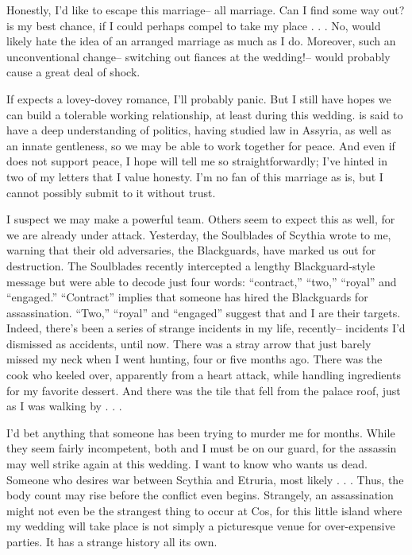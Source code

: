\documentclass[char]{Kos}
\begin{document}
Honestly, I'd like to escape this marriage-- all marriage. Can I find some way out? \cPoet{} is my best chance, if I could perhaps compel \cPoet{} to take my place . . . No, \cPoet{\they} would likely hate the idea of an arranged marriage as much as I do. Moreover, such an unconventional change-- switching out fiances at the wedding!-- would probably cause a great deal of shock.

 If \cBride{\they} expects a lovey-dovey romance, I'll probably panic. But I still have hopes we can build a tolerable working relationship, at least during this wedding. \cBride{\They} is said to have a deep understanding of politics, having studied law in Assyria, as well as an innate gentleness, so we may be able to work together for peace. And even if \cBride{\they} does not support peace, I hope \cBride{\they} will tell me so straightforwardly; I've hinted in two of my letters that I value honesty. I'm no fan of this marriage as is, but I cannot possibly submit to it without trust.

I suspect we may make a powerful team. Others seem to expect this as well, for we are already under attack. Yesterday, the Soulblades of Scythia wrote to me, warning that their old adversaries, the Blackguards, have marked us out for destruction. The Soulblades recently intercepted a lengthy Blackguard-style message but were able to decode just four words: ``contract,'' ``two,'' ``royal'' and ``engaged.'' ``Contract'' implies that someone has hired the Blackguards for assassination. ``Two,'' ``royal'' and ``engaged'' suggest that \cBride{\they} and I are their targets. Indeed, there's been a series of strange incidents in my life, recently-- incidents I'd dismissed as accidents, until now. There was a stray arrow that just barely missed my neck when I went hunting, four or five months ago. There was the cook who keeled over, apparently from a heart attack, while handling ingredients for my favorite dessert. And there was the tile that fell from the palace roof, just as I was walking by . . . 

I'd bet anything that someone has been trying to murder me for months. While they seem fairly incompetent, both \cBride{} and I must be on our guard, for the assassin may well strike again at this wedding. I want to know who wants us dead. Someone who desires war between Scythia and Etruria, most likely . . . Thus, the body count may rise before the conflict even begins. Strangely, an assassination might not even be the strangest thing to occur at Cos, for this little island where my wedding will take place is not simply a picturesque venue for over-expensive parties. It has a strange history all its own.
\end{document}
